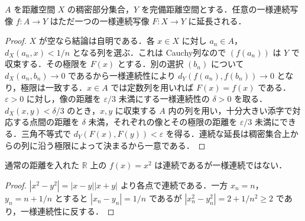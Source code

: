 \begin{prop}[稠密部分空間からの一様連続延長]
$A$ を距離空間 $X$ の稠密部分集合，$Y$ を完備距離空間とする．任意の一様連続写像 $f:A\to Y$ はただ一つの一様連続写像 $F:X\to Y$ に延長される．
\end{prop}
\begin{proof}
$X$ が空なら結論は自明である．各 $x\in X$ に対し $a_n\in A$，$d_X(a_n,x)<1/n$ となる列を選ぶ．これは Cauchy列なので $(f(a_n))$ は $Y$ で収束する．その極限を $F(x)$ とする．別の選択 $(b_n)$ について $d_X(a_n,b_n)\to0$ であるから一様連続性により $d_Y(f(a_n),f(b_n))\to0$ となり，極限は一致する．$x\in A$ では定数列を用いれば $F(x)=f(x)$ である．
$\varepsilon>0$ に対し，像の距離を $\varepsilon/3$ 未満にする一様連続性の $\delta>0$ を取る．$d_X(x,y)<\delta/3$ のとき，$x,y$ に収束する $A$ 内の列を用い，十分大きい添字で対応する点間の距離を $\delta$ 未満，それぞれの像とその極限の距離を $\varepsilon/3$ 未満にできる．三角不等式で $d_Y(F(x),F(y))<\varepsilon$ を得る．連続な延長は稠密集合上からの列に沿う極限によって決まるから一意である．
\end{proof}
\begin{example}[連続だが一様連続でない函数]
通常の距離を入れた $\mathbb R$ 上の $f(x)=x^2$ は連続であるが一様連続ではない．
\end{example}
\begin{proof}
$|x^2-y^2|=|x-y||x+y|$ より各点で連続である．一方 $x_n=n$，$y_n=n+1/n$ とすると $|x_n-y_n|=1/n$ であるが $|x_n^2-y_n^2|=2+1/n^2\geq2$ であり，一様連続性に反する．
\end{proof}
